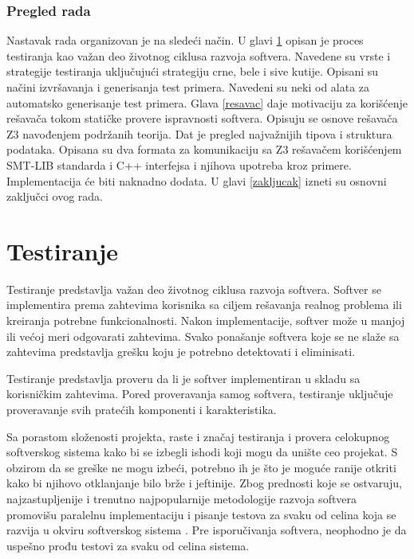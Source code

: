 \documentclass[12pt,oneside]{memoir}
\begin{document}
\subsection{Pregled rada}
Nastavak rada organizovan je na sledeći način. U glavi \ref{testiranje} opisan je proces testiranja kao važan deo životnog ciklusa razvoja softvera. Navedene su vrste i strategije testiranja uključujući strategiju crne, bele i sive kutije. Opisani su načini izvršavanja i generisanja test primera. Navedeni su neki od alata za automatsko generisanje test primera. Glava \ref{resavac} daje motivaciju za korišćenje rešavača tokom statičke provere ispravnosti softvera. Opisuju se osnove rešavača Z3 navođenjem podržanih teorija. Dat je pregled najvažnijih tipova i struktura podataka. Opisana su dva formata za komunikaciju sa Z3 rešavačem korišćenjem SMT-LIB standarda i C++ interfejsa i njihova upotreba kroz primere. Implementacija će biti naknadno dodata. U glavi \ref{zakljucak} izneti su osnovni zaključci ovog rada.



\chapter{Testiranje} \label{testiranje}

Testiranje predstavlja važan deo životnog ciklusa razvoja softvera. 
Softver se implementira prema zahtevima korisnika sa ciljem rešavanja realnog problema ili kreiranja potrebne funkcionalnosti. Nakon implementacije, softver može u manjoj ili većoj meri odgovarati zahtevima. Svako ponašanje softvera koje se ne slaže sa zahtevima predstavlja grešku koju je potrebno detektovati i eliminisati. 
\par
Testiranje predstavlja proveru da li je softver implementiran u skladu sa korisničkim zahtevima. Pored proveravanja samog softvera, testiranje uključuje proveravanje svih pratećih komponenti i karakteristika. 
\par 
Sa porastom složenosti projekta, raste i značaj testiranja i provera celokupnog softverskog sistema kako bi se izbegli ishodi koji mogu da unište ceo projekat. 
S obzirom da se greške ne mogu izbeći, potrebno ih je što je moguće ranije otkriti kako bi njihovo otklanjanje bilo brže i jeftinije. Zbog prednosti koje se ostvaruju, najzastupljenije i trenutno najpopularnije metodologije razvoja softvera promovišu paralelnu implementaciju i pisanje testova za svaku od celina koja se razvija u okviru softverskog sistema \cite{AgileDevelopment}. Pre isporučivanja softvera, neophodno je da uspešno prođu testovi za svaku od celina sistema.
\par 
\end{document}
